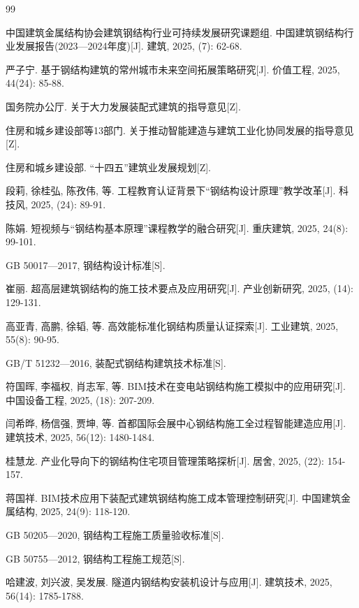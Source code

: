 ﻿\documentclass[UTF8,a4paper,10.5pt]{ctexart}
\begin{document}
\begin{thebibliography}{99}
\fontsize{9pt}{14pt}\selectfont\songti

中国建筑金属结构协会建筑钢结构行业可持续发展研究课题组. 中国建筑钢结构行业发展报告(2023—2024年度)[J]. 建筑, 2025, (7): 62-68.

严子宁. 基于钢结构建筑的常州城市未来空间拓展策略研究[J]. 价值工程, 2025, 44(24): 85-88.

国务院办公厅. 关于大力发展装配式建筑的指导意见[Z].

住房和城乡建设部等13部门. 关于推动智能建造与建筑工业化协同发展的指导意见[Z].

住房和城乡建设部. “十四五”建筑业发展规划[Z].

段莉, 徐桂弘, 陈孜伟, 等. 工程教育认证背景下“钢结构设计原理”教学改革[J]. 科技风, 2025, (24): 89-91.

陈娟. 短视频与“钢结构基本原理”课程教学的融合研究[J]. 重庆建筑, 2025, 24(8): 99-101.

GB 50017—2017, 钢结构设计标准[S].

崔丽. 超高层建筑钢结构的施工技术要点及应用研究[J]. 产业创新研究, 2025, (14): 129-131.

高亚青, 高鹏, 徐韬, 等. 高效能标准化钢结构质量认证探索[J]. 工业建筑, 2025, 55(8): 90-95.

GB/T 51232—2016, 装配式钢结构建筑技术标准[S].

符国晖, 李福权, 肖志军, 等. BIM技术在变电站钢结构施工模拟中的应用研究[J]. 中国设备工程, 2025, (18): 207-209.

闫希晔, 杨信强, 贾坤, 等. 首都国际会展中心钢结构施工全过程智能建造应用[J]. 建筑技术, 2025, 56(12): 1480-1484.

桂慧龙. 产业化导向下的钢结构住宅项目管理策略探析[J]. 居舍, 2025, (22): 154-157.

蒋国祥. BIM技术应用下装配式建筑钢结构施工成本管理控制研究[J]. 中国建筑金属结构, 2025, 24(9): 118-120.

GB 50205—2020, 钢结构工程施工质量验收标准[S].

GB 50755—2012, 钢结构工程施工规范[S].

哈建波, 刘兴波, 吴发展. 隧道内钢结构安装机设计与应用[J]. 建筑技术, 2025, 56(14): 1785-1788.


\end{thebibliography}
\end{document}
